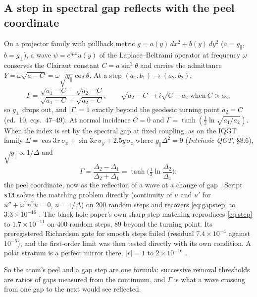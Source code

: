 \subsection{A step in spectral gap reflects with the peel coordinate}
On a projector family with pullback metric $g=a(y)\,dx^2+b(y)\,dy^2$ ($a=g_\parallel$, $b=g_\perp$), a wave $\psi=e^{ipx}u(y)$ of the Laplace–Beltrami operator at frequency $\omega$ conserves the Clairaut constant $C=a\sin^2\theta$ and carries the admittance $Y=\omega\sqrt{a-C}=\omega\sqrt{g_\parallel}\cos\theta$. At a step $(a_1,b_1)\to(a_2,b_2)$,
\begin{equation}
\Gamma=\frac{\sqrt{a_1-C}-\sqrt{a_2-C}}{\sqrt{a_1-C}+\sqrt{a_2-C}},\qquad \sqrt{a_2-C}\to i\sqrt{C-a_2}\ \text{when}\ C>a_2,
\label{eq:step}
\end{equation}
so $g_\perp$ drops out, and $|\Gamma|=1$ exactly beyond the geodesic turning point $a_2=C$  (ed.~10, eqs.~47–49). At normal incidence $C=0$ and $\Gamma=\tanh(\tfrac12\ln\sqrt{a_1/a_2})$. When the index is set by the spectral gap at fixed coupling, as on the IQGT family $\Sigma=\cos3x\,\sigma_x+\sin3x\,\sigma_y+2.5y\,\sigma_z$ where $g_\parallel\Delta^2=9$  (\emph{Intrinsic QGT}, §8.6), $\sqrt{g_\parallel}\propto1/\Delta$ and
\begin{equation}
\Gamma=\frac{\Delta_2-\Delta_1}{\Delta_2+\Delta_1}=\tanh\Big(\tfrac12\ln\frac{\Delta_2}{\Delta_1}\Big):
\label{eq:gapstep}
\end{equation}
the peel coordinate, now as the reflection of a wave at a change of gap . Script \texttt{s13} solves the matching problem directly (continuity of $u$ and $u'$ for $u''+\omega^2n^2u=0$, $n=1/\Delta$) on 200 random steps and recovers \eqref{eq:gapstep} to $3.3\times10^{-16}$ . The black-hole paper's own sharp-step matching reproduces \eqref{eq:step} to $1.7\times10^{-11}$ on 400 random steps, 89 beyond the turning point. Its preregistered Richardson gate for smooth steps failed (residual $7.4\times10^{-4}$ against $10^{-5}$), and the first-order limit was then tested directly with its own condition. A polar stratum is a perfect mirror there, $|r|=1$ to $2\times10^{-16}$ .

So the atom's peel and a gap step are one formula: successive removal thresholds are ratios of gaps measured from the continuum, and $\Gamma$ is what a wave crossing from one gap to the next would see reflected.

